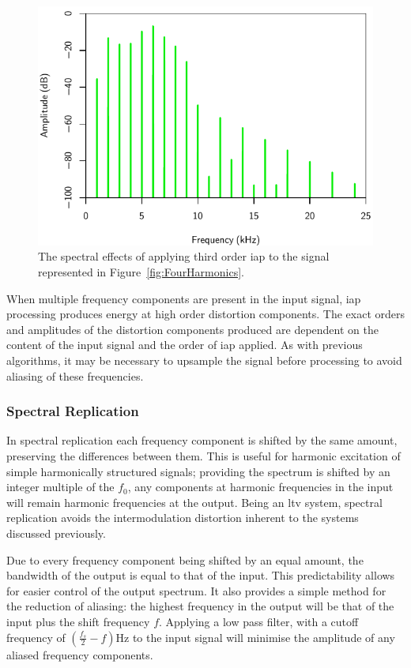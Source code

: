 			\begin{figure}[h!]
				\centering
				\includegraphics{chapter5/Images/IAP3Spectra.pdf}
				\caption{The spectral effects of applying third order \acrshort{iap} to the signal
				represented in Figure~\ref{fig:FourHarmonics}.}
				\label{fig:IAP3Spectra}
			\end{figure}

			When multiple frequency components are present in the input signal, \acrshort{iap} processing
			produces energy at high order distortion components. The exact orders and amplitudes of the
			distortion components produced are dependent on the content of the input signal and the order of
			\acrshort{iap} applied. As with previous algorithms, it may be necessary to upsample the signal
			before processing to avoid aliasing of these frequencies.

		\subsubsection*{Spectral Replication}
			In spectral replication each frequency component is shifted by the same amount, preserving the
			differences between them. This is useful for harmonic excitation of simple harmonically structured
			signals; providing the spectrum is shifted by an integer multiple of the $f_{0}$, any components at
			harmonic frequencies in the input will remain harmonic frequencies at the output. Being an
			\acrshort{ltv} system, spectral replication avoids the intermodulation distortion inherent to the
			systems discussed previously. 

			Due to every frequency component being shifted by an equal amount, the bandwidth of the output is
			equal to that of the input. This predictability allows for easier control of the output spectrum.
			It also provides a simple method for the reduction of aliasing: the highest frequency in the output
			will be that of the input plus the shift frequency $f$. Applying a low pass filter, with a cutoff
			frequency of $\left( \frac{f_{s}}{2} - f \right)$Hz to the input signal will minimise the amplitude
			of any aliased frequency components.

